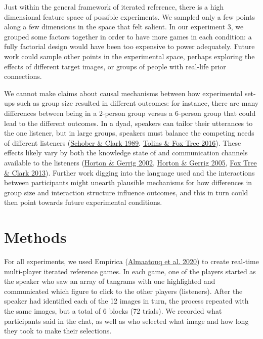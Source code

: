 \documentclass[
  english,
  a4paper,
]{article}
\begin{document}
Just within the general framework of iterated reference, there is a high dimensional feature space of possible experiments. We sampled only a few points along a few dimensions in the space that felt salient. In our experiment 3, we grouped some factors together in order to have more games in each condition: a fully factorial design would have been too expensive to power adequately. Future work could sample other points in the experimental space, perhaps exploring the effects of different target images, or groups of people with real-life prior connections.

We cannot make claims about causal mechanisms between how experimental set-ups such as group size resulted in different outcomes: for instance, there are many differences between being in a 2-person group versus a 6-person group that could lead to the different outcomes. In a dyad, speakers can tailor their utterances to the one listener, but in large groups, speakers must balance the competing needs of different listeners (\protect\hyperlink{ref-schober1989}{Schober \& Clark 1989}, \protect\hyperlink{ref-tolins2016}{Tolins \& Fox Tree 2016}). These effects likely vary by both the knowledge state of and communication channels available to the listeners (\protect\hyperlink{ref-horton2002}{Horton \& Gerrig 2002}, \protect\hyperlink{ref-horton2005}{Horton \& Gerrig 2005}, \protect\hyperlink{ref-fox-tree2013}{Fox Tree \& Clark 2013}). Further work digging into the language used and the interactions between participants might unearth plausible mechanisms for how differences in group size and interaction structure influence outcomes, and this in turn could then point towards future experimental conditions.

\hypertarget{methods}{%
\section{Methods}\label{methods}}

For all experiments, we used Empirica (\protect\hyperlink{ref-almaatouqEmpiricaVirtualLab2020}{Almaatouq et al. 2020}) to create real-time multi-player iterated reference games. In each game, one of the players started as the speaker who saw an array of tangrams with one highlighted and communicated which figure to click to the other players (listeners). After the speaker had identified each of the 12 images in turn, the process repeated with the same images, but a total of 6 blocks (72 trials). We recorded what participants said in the chat, as well as who selected what image and how long they took to make their selections.
\end{document}
